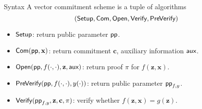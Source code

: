 \begin{frame}{Syntax}
	A vector commitment scheme is a tuple of algorithms
	\begin{equation*}
		(\textsf{Setup}, \textsf{Com}, \textsf{Open}, \textsf{Verify}, \textsf{PreVerify})
	\end{equation*}
	
	\begin{itemize}
		\item$\textsf{Setup}$: return public parameter $\textsf{pp}$.
		\item$\textsf{Com}(\textsf{pp}, \mathbf{x})$: return commitment $\mathbf{c}$, auxiliary information $\textsf{aux}$.
		\item$\textsf{Open}(\textsf{pp}, f(\cdot, \cdot), \mathbf{z}, \textsf{aux})$: return proof $\pi$ for $f(\mathbf{z}, \mathbf{x})$. 
		\item$\textsf{PreVerify}(\textsf{pp}, f(\cdot, \cdot), y(\cdot))$: return public parameter $\textsf{pp}_{f, y}$.
		\item$\textsf{Verify}(\textsf{pp}_{f, y}, \mathbf{z}, \mathbf{c}, \pi)$: verify whether $f(\mathbf{z}, \mathbf{x}) = g(\mathbf{z})$.
	\end{itemize}
\end{frame}